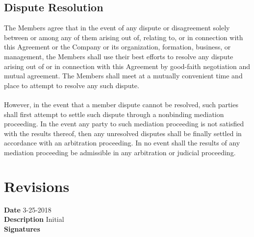 \documentclass[11pt]{article}
\begin{document}
\subsection{Dispute Resolution}
The Members agree that in the event of any dispute or disagreement solely between or among any of them arising out of, relating to, or in connection with this Agreement or the Company or its organization, formation, business, or management, the Members shall use their best efforts to resolve any dispute arising out of or in connection with this Agreement by good-faith negotiation and mutual agreement. The Members shall meet at a mutually convenient time and place to attempt to resolve any such dispute.\\\\
However, in the event that a member dispute cannot be resolved, such parties shall first attempt to settle such dispute through a nonbinding mediation proceeding. In the event any party to such mediation proceeding is not satisfied with the results thereof, then any unresolved disputes shall be finally settled in accordance with an arbitration proceeding. In no event shall the results of any mediation proceeding be admissible in any arbitration or judicial proceeding.


\section{Revisions}
\label{sec:revisions}

\textbf{Date} 3-25-2018 \\
\textbf{Description} Initial \\
\textbf{Signatures} \\\\

\vspace*{\fill}

\begin{flushright}

\pdfcreationdate
\end{flushright}
\end{document}
